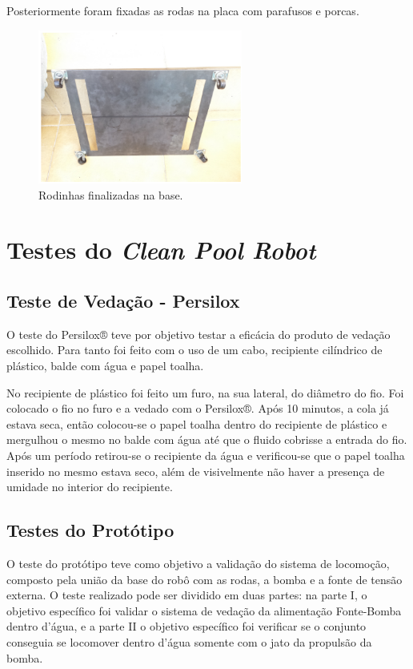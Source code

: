 Posteriormente foram fixadas as rodas na placa com parafusos e porcas.

\par
\begin{figure}[h]
  \centering
  \includegraphics[width=0.6\textwidth]{figures/rodinhas.png}
  \caption{Rodinhas finalizadas na base.}
  \label{fig:rodinhas}
\end{figure}
\FloatBarrier
\par

\chapter{Testes do \textit{Clean Pool Robot}}
\section{Teste de Vedação - Persilox}
O teste do Persilox® teve por objetivo testar a eficácia do produto de vedação escolhido. Para tanto foi feito com o uso de um cabo, recipiente cilíndrico de plástico, balde com água e papel toalha.

No recipiente de plástico foi feito um furo, na sua lateral, do diâmetro do fio. Foi colocado o fio no furo e a vedado com o Persilox®. Após 10 minutos, a cola já estava seca, então colocou-se o papel toalha dentro do recipiente de plástico e mergulhou o mesmo no balde com água até que o fluido cobrisse a entrada do fio. Após um período retirou-se o recipiente da água e verificou-se que o papel toalha inserido no mesmo estava seco, além de visivelmente não haver a presença de umidade no interior do recipiente.

\section{Testes do Protótipo}
O teste do protótipo teve como objetivo a validação do  sistema de locomoção, composto pela união da base do robô com as rodas, a bomba e a fonte de tensão externa. O teste realizado pode ser dividido em duas partes: na parte I, o objetivo específico foi validar o sistema de vedação da alimentação Fonte-Bomba dentro d’água, e a  parte II o objetivo específico foi verificar se o conjunto conseguia se locomover dentro d’água somente com o jato da propulsão da bomba.

